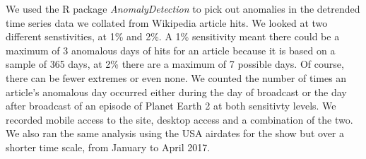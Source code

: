 \documentclass[12pt,letterpaper]{article}
\begin{document}
We used the R package \textit{AnomalyDetection} to pick out anomalies in the detrended time series data we collated from Wikipedia article hits. We looked at two different senstivities, at 1\% and 2\%. A 1\% sensitivity meant there could be a maximum of 3 anomalous days of hits for an article because it is based on a sample of 365 days, at 2\% there are a maximum of 7 possible days. Of course, there can be fewer extremes or even none. We counted the number of times an article's anomalous day occurred either during the day of broadcast or the day after broadcast of an episode of Planet Earth 2 at both sensitivty levels. We recorded mobile access to the site, desktop access and a combination of the two. We also ran the same analysis using the USA airdates for the show but over a shorter time scale, from January to April 2017.   









%
%
\end{document}
